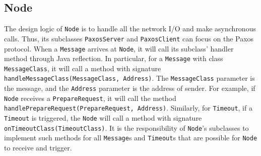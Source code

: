 \documentclass{article}
\numberwithin{equation}{section}
\begin{document}
\subsection{Node}
The design logic of \verb|Node| is to handle all the network I/O and make asynchronous calls. Thus, its subclasses \verb|PaxosServer| and \verb|PaxosClient| can focus on the Paxos protocol. When a \verb|Message| arrives at \verb|Node|, it will call its subclass' handler method through Java reflection. In particular, for a \verb|Message| with class \verb|MessageClass|, it will call a method with signature \verb|handleMessageClass(MessageClass, Address)|. The \verb|MessageClass| parameter is the message, and the \verb|Address| parameter is the address of sender. For example, if \verb|Node| receives a \verb|PrepareRequest|, it will call the method \verb|handlePrepareRequest(PrepareRequest, Address)|. Similarly, for \verb|Timeout|, if a \verb|Timeout| is triggered, the \verb|Node| will call a method with signature \verb|onTimeoutClass(TimeoutClass)|. It is the responsibility of \verb|Node|'s subclasses to implement such methods for all \verb|Message|s and \verb|Timeout|s that are possible for \verb|Node| to receive and trigger.
\end{document}
